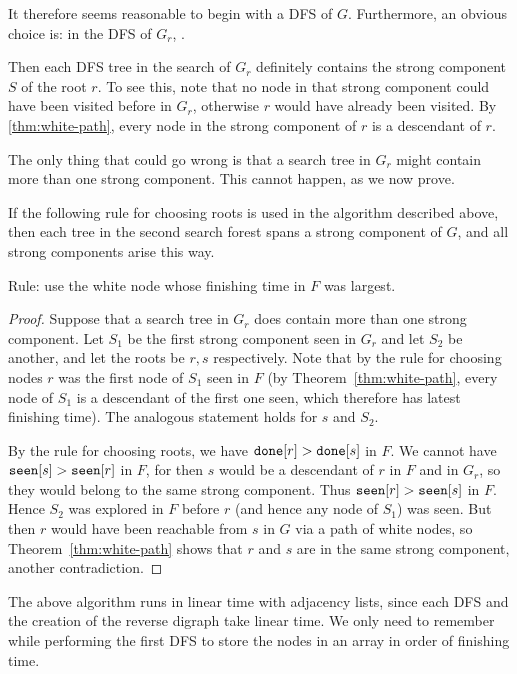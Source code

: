 It therefore seems reasonable to begin with a DFS of $G$. Furthermore,
an obvious choice is: in the DFS of $G_r$, .

Then each DFS tree in the search of $G_r$ definitely contains the strong
component $S$ of the root $r$. To see this, note that no node in that
strong component could have been visited before in $G_r$, otherwise $r$
would have already been visited. By \cref{thm:white-path}, every
node in the strong component of $r$ is a descendant of $r$.

The only thing that could go wrong is that a search tree in $G_r$
might contain more than one strong component. This cannot happen,
as we now prove.

\begin{Theorem} \label{thm:scc-alg} 
If the following rule for choosing roots is used in the algorithm
described above, then each tree in the second search forest spans a
strong component of $G$, and all strong components arise this way.

Rule: use the white node whose finishing time in $F$ was largest.
\end{Theorem}

\begin{proof}
Suppose that a search tree in $G_r$ does  contain more than one strong
component. Let $S_1$ be the first strong component seen in $G_r$ and let
$S_2$ be another, and let the roots be $r, s$ respectively. Note that by
the rule for choosing nodes $r$ was the first node of $S_1$ seen in $F$
(by Theorem~\ref{thm:white-path}, every node of $S_1$ is a descendant
of the first one seen, which therefore has latest finishing time). The
analogous statement holds for $s$ and $S_2$.

By the rule for choosing roots, we have $\done[r] > \done[s]$ in $F$. We
cannot have $\seen[s] > \seen[r]$ in $F$, for then $s$ would be a descendant
of $r$ in $F$ and in $G_r$, so they would belong to the same strong
component. Thus $\seen[r] > \seen[s]$ in $F$. Hence $S_2$ was explored
in $F$ before $r$ (and hence any node of $S_1$) was seen. But then $r$
would have been reachable from $s$ in $G$ via a path of white nodes,
so Theorem~\ref{thm:white-path} shows that $r$ and $s$ are in the same
strong component, another contradiction.
\end{proof} 

The above algorithm runs in linear time with adjacency lists, since each
DFS and the creation of the reverse digraph take linear time. We only
need to remember  while performing the first DFS to store the nodes in
an array in order of finishing time. 

